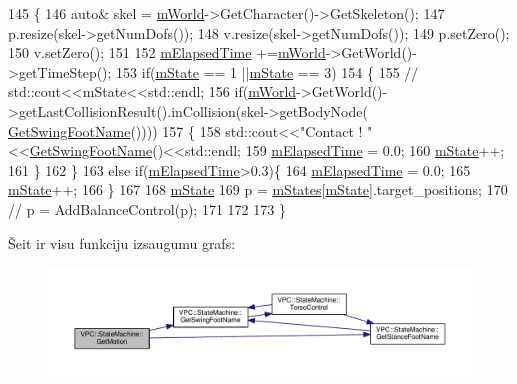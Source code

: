 \begin{DoxyCode}
145 \{
146     \textcolor{keyword}{auto}& skel = \hyperlink{class_v_p_c_1_1_state_machine_a50cdee7e7d9a0824f067d0bf1b312c32}{mWorld}->GetCharacter()->GetSkeleton();
147     p.resize(skel->getNumDofs());
148     v.resize(skel->getNumDofs());
149     p.setZero();
150     v.setZero();
151 
152     \hyperlink{class_v_p_c_1_1_state_machine_a84f9280c1fdceceb1370f019bdf0765b}{mElapsedTime} +=\hyperlink{class_v_p_c_1_1_state_machine_a50cdee7e7d9a0824f067d0bf1b312c32}{mWorld}->GetWorld()->getTimeStep();
153     \textcolor{keywordflow}{if}(\hyperlink{class_v_p_c_1_1_state_machine_abdbff835fd0b042e99de640d88000ce1}{mState} == 1 ||\hyperlink{class_v_p_c_1_1_state_machine_abdbff835fd0b042e99de640d88000ce1}{mState} == 3)
154     \{
155         \textcolor{comment}{// std::cout<<mState<<std::endl;}
156         \textcolor{keywordflow}{if}(\hyperlink{class_v_p_c_1_1_state_machine_a50cdee7e7d9a0824f067d0bf1b312c32}{mWorld}->GetWorld()->getLastCollisionResult().inCollision(skel->getBodyNode(
      \hyperlink{class_v_p_c_1_1_state_machine_a3a82e5a3e97af57259dd438e1666850f}{GetSwingFootName}())))
157         \{
158             std::cout<<\textcolor{stringliteral}{"Contact ! "}<<\hyperlink{class_v_p_c_1_1_state_machine_a3a82e5a3e97af57259dd438e1666850f}{GetSwingFootName}()<<std::endl;
159             \hyperlink{class_v_p_c_1_1_state_machine_a84f9280c1fdceceb1370f019bdf0765b}{mElapsedTime} = 0.0;
160             \hyperlink{class_v_p_c_1_1_state_machine_abdbff835fd0b042e99de640d88000ce1}{mState}++;
161         \}
162     \}
163     \textcolor{keywordflow}{else} \textcolor{keywordflow}{if}(\hyperlink{class_v_p_c_1_1_state_machine_a84f9280c1fdceceb1370f019bdf0765b}{mElapsedTime}>0.3)\{
164         \hyperlink{class_v_p_c_1_1_state_machine_a84f9280c1fdceceb1370f019bdf0765b}{mElapsedTime} = 0.0;
165         \hyperlink{class_v_p_c_1_1_state_machine_abdbff835fd0b042e99de640d88000ce1}{mState}++;
166     \}
167 
168     \hyperlink{class_v_p_c_1_1_state_machine_abdbff835fd0b042e99de640d88000ce1}{mState} %
169     p = \hyperlink{class_v_p_c_1_1_state_machine_a31a1498d9a99c4f7b60ec326b002d514}{mStates}[\hyperlink{class_v_p_c_1_1_state_machine_abdbff835fd0b042e99de640d88000ce1}{mState}].target\_positions;
170 \textcolor{comment}{//  p = AddBalanceControl(p);}
171 
172 
173 \}
\end{DoxyCode}


Šeit ir visu funkciju izsaugumu grafs\+:
\nopagebreak
\begin{figure}[H]
\begin{center}
\leavevmode
\includegraphics[width=350pt]{class_v_p_c_1_1_state_machine_a83142e6c04d30eeb8beb49b331ba5b74_cgraph}
\end{center}
\end{figure}




